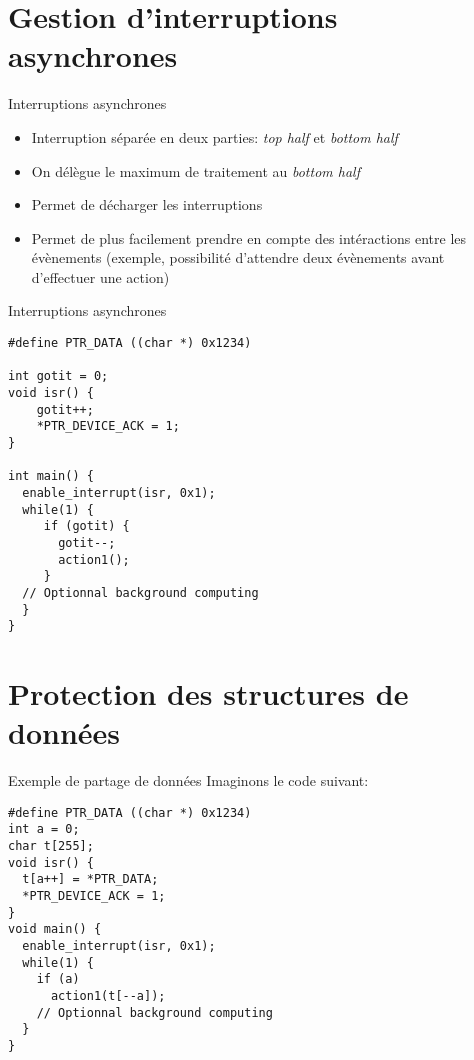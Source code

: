 \section{Gestion d'interruptions asynchrones} 

\begin{frame}[fragile]{Interruptions asynchrones}
  \begin{itemize} 
  \item  Interruption  séparée en  deux  parties:  \emph{top half}  et
    \emph{bottom half}
  \item On délègue le maximum de traitement au \emph{bottom half}
  \item Permet de décharger les interruptions
  \item Permet  de plus facilement prendre en  compte des intéractions
    entre  les   évènements  (exemple,  possibilité   d'attendre  deux
    évènements avant d'effectuer une action)
  \end{itemize}
\end{frame}

\begin{frame}[fragile]{Interruptions asynchrones}
  \begin{lstlisting} 
#define PTR_DATA ((char *) 0x1234)

int gotit = 0;
void isr() {
    gotit++;
    *PTR_DEVICE_ACK = 1;
}

int main() {
  enable_interrupt(isr, 0x1);
  while(1) {
     if (gotit) {
       gotit--;
       action1();
     }
  // Optionnal background computing 
  }
}
  \end{lstlisting} 
\end{frame} 

\section{Protection des structures de données}

\begin{frame}[fragile]{Exemple de partage de données}
  Imaginons le code suivant:
  \begin{lstlisting}
#define PTR_DATA ((char *) 0x1234)
int a = 0;
char t[255];
void isr() {
  t[a++] = *PTR_DATA;
  *PTR_DEVICE_ACK = 1;
}
void main() {
  enable_interrupt(isr, 0x1);
  while(1) {
    if (a)
      action1(t[--a]);
    // Optionnal background computing 
  }
}
  \end{lstlisting}
\end{frame} 


